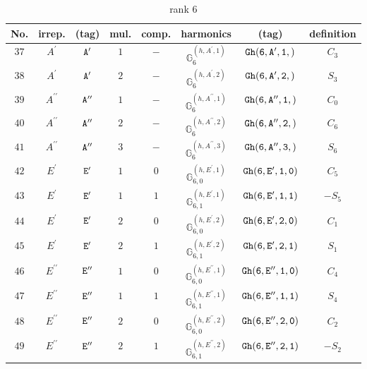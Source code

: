 \documentclass[fleqn,8pt]{jsarticle}
\begin{document}
\begin{table}[ht!]
\begin{center}
\caption{rank 6}
\renewcommand{\arraystretch}{1.3}
\begin{tabular}{cccccccc} \hline \hline
No. & irrep. & (tag) & mul. & comp. & harmonics & (tag) & definition \\ \hline
$ 37 $ & $ A^{\prime} $ & $ {\tt A'} $ & $ 1 $ & $ - $ & $ \mathbb{G}_{6}^{(h,A^{\prime},1)} $ & $ {\tt Gh(6,A',1,)} $ & $ C_{3} $ \\
$ 38 $ & $ A^{\prime} $ & $ {\tt A'} $ & $ 2 $ & $ - $ & $ \mathbb{G}_{6}^{(h,A^{\prime},2)} $ & $ {\tt Gh(6,A',2,)} $ & $ S_{3} $ \\
$ 39 $ & $ A^{\prime\prime} $ & $ {\tt A''} $ & $ 1 $ & $ - $ & $ \mathbb{G}_{6}^{(h,A^{\prime\prime},1)} $ & $ {\tt Gh(6,A'',1,)} $ & $ C_{0} $ \\
$ 40 $ & $ A^{\prime\prime} $ & $ {\tt A''} $ & $ 2 $ & $ - $ & $ \mathbb{G}_{6}^{(h,A^{\prime\prime},2)} $ & $ {\tt Gh(6,A'',2,)} $ & $ C_{6} $ \\
$ 41 $ & $ A^{\prime\prime} $ & $ {\tt A''} $ & $ 3 $ & $ - $ & $ \mathbb{G}_{6}^{(h,A^{\prime\prime},3)} $ & $ {\tt Gh(6,A'',3,)} $ & $ S_{6} $ \\
$ 42 $ & $ E^{\prime} $ & $ {\tt E'} $ & $ 1 $ & $ 0 $ & $ \mathbb{G}_{6,0}^{(h,E^{\prime},1)} $ & $ {\tt Gh(6,E',1,0)} $ & $ C_{5} $ \\
$ 43 $ & $ E^{\prime} $ & $ {\tt E'} $ & $ 1 $ & $ 1 $ & $ \mathbb{G}_{6,1}^{(h,E^{\prime},1)} $ & $ {\tt Gh(6,E',1,1)} $ & $ - S_{5} $ \\
$ 44 $ & $ E^{\prime} $ & $ {\tt E'} $ & $ 2 $ & $ 0 $ & $ \mathbb{G}_{6,0}^{(h,E^{\prime},2)} $ & $ {\tt Gh(6,E',2,0)} $ & $ C_{1} $ \\
$ 45 $ & $ E^{\prime} $ & $ {\tt E'} $ & $ 2 $ & $ 1 $ & $ \mathbb{G}_{6,1}^{(h,E^{\prime},2)} $ & $ {\tt Gh(6,E',2,1)} $ & $ S_{1} $ \\
$ 46 $ & $ E^{\prime\prime} $ & $ {\tt E''} $ & $ 1 $ & $ 0 $ & $ \mathbb{G}_{6,0}^{(h,E^{\prime\prime},1)} $ & $ {\tt Gh(6,E'',1,0)} $ & $ C_{4} $ \\
$ 47 $ & $ E^{\prime\prime} $ & $ {\tt E''} $ & $ 1 $ & $ 1 $ & $ \mathbb{G}_{6,1}^{(h,E^{\prime\prime},1)} $ & $ {\tt Gh(6,E'',1,1)} $ & $ S_{4} $ \\
$ 48 $ & $ E^{\prime\prime} $ & $ {\tt E''} $ & $ 2 $ & $ 0 $ & $ \mathbb{G}_{6,0}^{(h,E^{\prime\prime},2)} $ & $ {\tt Gh(6,E'',2,0)} $ & $ C_{2} $ \\
$ 49 $ & $ E^{\prime\prime} $ & $ {\tt E''} $ & $ 2 $ & $ 1 $ & $ \mathbb{G}_{6,1}^{(h,E^{\prime\prime},2)} $ & $ {\tt Gh(6,E'',2,1)} $ & $ - S_{2} $ \\
 \hline \hline
\end{tabular}
\end{center}
\end{table}
\end{document}
